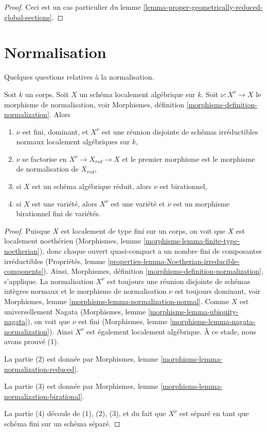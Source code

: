 \begin{proof}
 Ceci est un cas particulier du
lemme \ref{lemma-proper-geometrically-reduced-global-sections}. 
\end{proof}




\section{Normalisation} 
\label{section-normalization}

\noindent
 Quelques questions relatives à la normalisation.

\begin{lemma}
\label{lemma-normalization-locally-algebraic}
 Soit $k$ un corps. Soit $X$ un schéma localement algébrique sur $k$.
Soit $\nu : X^\nu \to X$ le morphisme de normalisation,
voir Morphismes, définition \ref{morphisms-definition-normalization}.
Alors 
\begin{enumerate}
\item $\nu$ est fini, dominant, et $X^\nu$ est une
réunion disjointe de schémas irréductibles normaux localement algébriques sur $k$, 
\item $\nu$ se factorise en $X^\nu \to X_{red} \to X$ et le
premier morphisme est le morphisme de normalisation de $X_{red}$, 
\item si $X$ est un schéma algébrique réduit, alors $\nu$
 est birationnel, 
\item si $X$ est une variété, alors $X^\nu$ est une variété et 
$\nu$ est un morphisme birationnel fini de variétés. 
\end{enumerate}
\end{lemma}

\begin{proof}
 Puisque $X$ est localement de type fini sur un corps, on voit que 
$X$ est localement noethérien
(Morphismes, lemme \ref{morphisms-lemma-finite-type-noetherian}),
donc chaque ouvert quasi-compact a un nombre fini
de composantes irréductibles (Propriétés, lemme 
\ref{properties-lemma-Noetherian-irreducible-components}).
Ainsi, Morphismes, définition \ref{morphisms-definition-normalization}, s'applique.
La normalisation $X^\nu$ est toujours une réunion disjointe de schémas
intègres normaux et le morphisme de normalisation $\nu$ est toujours dominant,
voir Morphismes, lemme \ref{morphisms-lemma-normalization-normal}.
Comme $X$ est universellement Nagata
(Morphismes, lemme \ref{morphisms-lemma-ubiquity-nagata}),
on voit que $\nu$ est
fini (Morphismes, lemme \ref{morphisms-lemma-nagata-normalization}).
Ainsi $X^\nu$ est également localement algébrique. À
ce stade, nous avons prouvé (1).

\medskip\noindent
 La partie (2) est donnée par Morphismes, lemme \ref{morphisms-lemma-normalization-reduced}.

\medskip\noindent
 La partie (3) est donnée par Morphismes, lemme \ref{morphisms-lemma-normalization-birational}.

\medskip\noindent
 La partie (4) découle de (1), (2), (3), et du fait que $X^\nu$
 est séparé en tant que schéma fini sur un schéma séparé. 
\end{proof}


